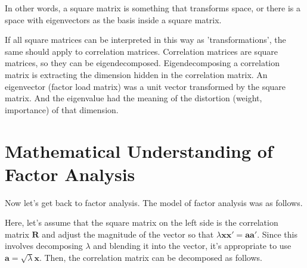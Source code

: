 \documentclass{ltjsbook}
\begin{document}
In other words, a square matrix is something that transforms space, or there is a space with eigenvectors as the basis inside a square matrix.

If all square matrices can be interpreted in this way as 'transformations', the same should apply to correlation matrices. Correlation matrices are square matrices, so they can be eigendecomposed. Eigendecomposing a correlation matrix is extracting the dimension hidden in the correlation matrix. An eigenvector (factor load matrix) was a unit vector transformed by the square matrix. And the eigenvalue had the meaning of the distortion (weight, importance) of that dimension.

\section{Mathematical Understanding of Factor Analysis}
Now let's get back to factor analysis. The model of factor analysis was as follows.


Here, let's assume that the square matrix on the left side is the correlation matrix $\bm{R}$ and adjust the magnitude of the vector so that $\lambda \bm{xx'} = \bm{aa'}$. Since this involves decomposing $\lambda$ and blending it into the vector, it's appropriate to use $\bm{a} = \sqrt{\lambda}\bm{x}$. Then, the correlation matrix can be decomposed as follows.

\end{document}

